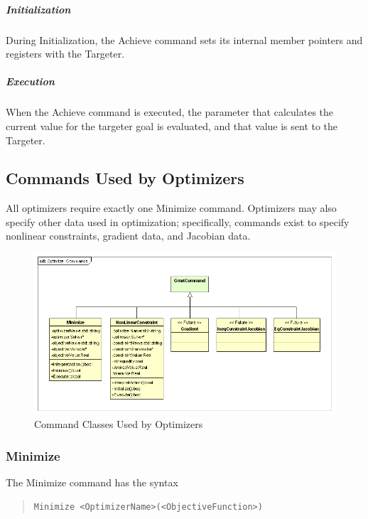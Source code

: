 \subparagraph{Initialization}

During Initialization, the Achieve command sets its internal member pointers and registers with the
Targeter.

\subparagraph{Execution}

When the Achieve command is executed, the parameter that calculates the current value for the
targeter goal is evaluated, and that value is sent to the Targeter.

\subsection{\label{section:OptimizationCommands}Commands Used by Optimizers}

All optimizers require exactly one Minimize command.  Optimizers may also specify other data used
in optimization; specifically, commands exist to specify nonlinear constraints, gradient data, and
Jacobian data.

\begin{figure}
\begin{center}
\includegraphics[390,209]{Images/OptimizerCommands.png}
\caption{\label{figure:OptimizerCommands}Command Classes Used by Optimizers}
\end{center}
\end{figure}

\subsubsection{Minimize}

The Minimize command has the syntax

\begin{quote}
\begin{verbatim}
Minimize <OptimizerName>(<ObjectiveFunction>)
\end{verbatim}
\end{quote}

